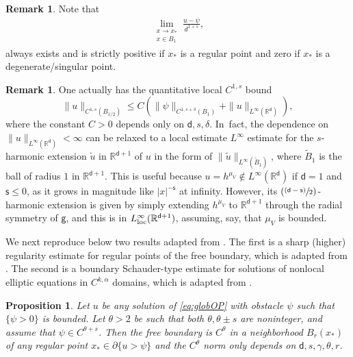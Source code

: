 \documentclass[JEP,XML,SOM,Unicode,published]{cedram}
\newcommand{\psfrac}[2]{\sfrac{(#1)}{#2}}
\newcommand{\loc}{\textup{loc}}
\theoremstyle{plain}
\newtheorem{prop}[thm]{Proposition}
\theoremstyle{definition}
\newtheorem{remark}[thm]{Remark}
\newcommand{\R}{{\mathbb{R}}}
\let\al\alpha
\let\ga\gamma
\let\p\partial
\let\tl\tilde
\renewcommand{\d}{\mathsf{d}}
\newcommand{\g}{{\mathsf{g}}}
\newcommand{\s}{\mathsf{s}}
\begin{document}
\begin{remark}
Note that
\begin{align*}
\lim_{\substack{x\to x_* \\ x\in B_1}} \frac{u-\psi}{d^{1+s}},
\end{align*}
always exists and is strictly positive if $x_*$ is a regular point and zero if $x_*$ is a degenerate/singular point.
\end{remark}

\begin{remark}\label{rem:OPreg}
One actually has the quantitative local $C^{1,s}$ bound
\begin{equation}\label{eq:OPreg}
\|u\|_{C^{1,s}(B_{1/2})} \le C(\|\psi\|_{C^{1,s+\delta}(B_1)} + \|u\|_{L^\infty(\R^\d)}),
\end{equation}
where the constant $C>0$ depends only on $\d,s,\delta$. In~fact, the dependence on $\|u\|_{L^\infty(\R^\d)}<\infty$ can be relaxed to a local estimate $L^\infty$ estimate for the $s$-harmonic extension $\tl{u}$ in $\R^{\d+1}$ of $u$ in the form of $\|\tl{u}\|_{L^\infty(\tl{B}_1)}$, where $\tl{B}_1$ is the ball of radius $1$ in $\R^{\d+1}$. This is useful because $u=h^{\mu_V}\notin L^\infty(\R^\d)$ if $\d=1$ and $\s\le 0$, as it grows in magnitude like $|x|^{-\s}$ at infinity. However, its $(\psfrac{\d-\s}{2})$-harmonic extension is given by simply extending $h^{\mu_V}$ to $\R^{\d+1}$ through the radial symmetry of $\g$, and this is in $L_{\loc}^\infty(\R^{\d+1})$, assuming, say, that $\mu_V$ is bounded.
\end{remark}

We next reproduce below two results adapted from \cite{ArO2020}. The first is a sharp (higher) regularity estimate for regular points of the free boundary, which is adapted from \cite[Th.\,1.2]{ArO2020}. The second is a boundary Schauder-type estimate for solutions of nonlocal elliptic equations in $C^{k,\al}$ domains, which is adapted from \cite[Th.\,1.4]{ArO2020}.

\begin{prop}\label{lem:ArO1}
Let $u$ be any solution of \eqref{eq:globOP} with obstacle $\psi$ such that $\{\psi>0\}$ is bounded. Let $\theta>2$ be such that both $\theta,\theta\pm s$ are noninteger, and assume that $\psi \in C^{\theta+s}$. Then the free boundary is $C^\theta$ in a neighborhood $B_r(x_*)$ of any regular point $x_* \in \p\{u>\psi\}$ and the $C^\theta$ norm only depends on $\d,s,\ga,\theta,r$.
\end{prop}
\end{document}
